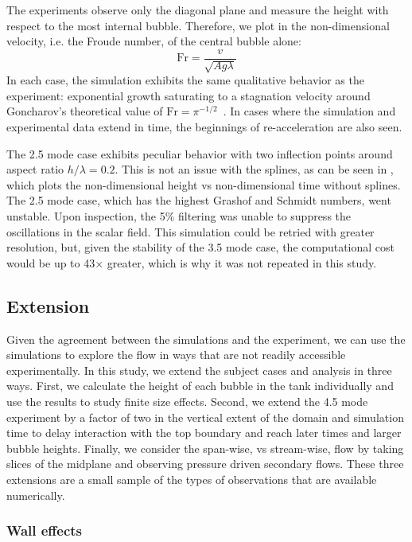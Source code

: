 The experiments observe only the diagonal plane and measure the height with respect to the most internal bubble.
Therefore, we plot in  the non-dimensional velocity, i.e. the Froude number, of the central bubble alone:
\begin{equation}
	\text{Fr} = \frac{v}{\sqrt{ A g \lambda}}
\end{equation}
In each case, the simulation exhibits the same qualitative behavior as the experiment:
exponential growth saturating to a stagnation velocity around Goncharov's theoretical value of $\text{Fr} = \pi^{-1/2}$~\cite{Goncharov2002}.
In cases where the simulation and experimental data extend in time, the beginnings of re-acceleration are also seen.

The 2.5 mode case exhibits peculiar behavior with two inflection points around aspect ratio $h / \lambda = 0.2$.
This is not an issue with the splines, as can be seen in , which plots the non-dimensional height vs non-dimensional time without splines.
The 2.5 mode case, which has the highest Grashof and Schmidt numbers, went unstable.
Upon inspection, the 5\% filtering was unable to suppress the oscillations in the scalar field.
This simulation could be retried with greater resolution, but, given the stability of the 3.5 mode case, the computational cost would be up to 43$\times$ greater, which is why it was not repeated in this study.

\subsection{Extension}

Given the agreement between the simulations and the experiment, we can use the simulations to explore the flow in ways that are not readily accessible experimentally.
In this study, we extend the subject cases and analysis in three ways.
First, we calculate the height of each bubble in the tank individually and use the results to study finite size effects.
Second, we extend the 4.5 mode experiment by a factor of two in the vertical extent of the domain and simulation time to delay interaction with the top boundary and reach later times and larger bubble heights.
Finally, we consider the span-wise, vs stream-wise, flow by taking slices of the midplane and observing pressure driven secondary flows.
These three extensions are a small sample of the types of observations that are available numerically.

\subsubsection{Wall effects}

